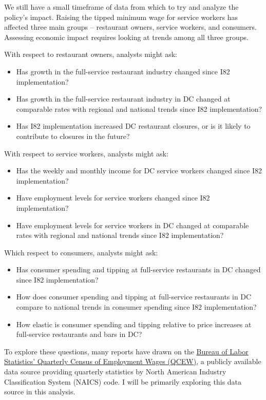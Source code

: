 \documentclass[
  14pt,
]{article}
\providecommand{\tightlist}{%
  \setlength{\itemsep}{0pt}\setlength{\parskip}{0pt}}
\begin{document}
We still have a small timeframe of data from which to try and analyze
the policy's impact. Raising the tipped minimum wage for service workers
has affected three main groups -- restaurant owners, service workers,
and consumers. Assessing economic impact requires looking at trends
among all three groups.

With respect to restaurant owners, analysts might ask:

\begin{itemize}
\tightlist
\item
  Has growth in the full-service restaurant industry changed since I82
  implementation?
\item
  Has growth in the full-service restaurant industry in DC changed at
  comparable rates with regional and national trends since I82
  implementation?
\item
  Has I82 implementation increased DC restaurant closures, or is it
  likely to contribute to closures in the future?
\end{itemize}

With respect to service workers, analysts might ask:

\begin{itemize}
\tightlist
\item
  Has the weekly and monthly income for DC service workers changed since
  I82 implementation?
\item
  Have employment levels for service workers changed since I82
  implementation?
\item
  Have employment levels for service workers in DC changed at comparable
  rates with regional and national trends since I82 implementation?
\end{itemize}

Which respect to consumers, analysts might ask:

\begin{itemize}
\tightlist
\item
  Has consumer spending and tipping at full-service restaurants in DC
  changed since I82 implementation?
\item
  How does consumer spending and tipping at full-service restaurants in
  DC compare to national trends in consumer spending since I82
  implementation?
\item
  How elastic is consumer spending and tipping relative to price
  increases at full-service restaurants and bars in DC?
\end{itemize}

To explore these questions, many reports have drawn on the
\href{https://www.bls.gov/cew/downloadable-data-files.htm}{Bureau of
Labor Statistics' Quarterly Census of Employment Wages (QCEW)}, a
publicly available data source providing quarterly statistics by North
American Industry Classification System (NAICS) code. I will be
primarily exploring this data source in this analysis.
\end{document}
